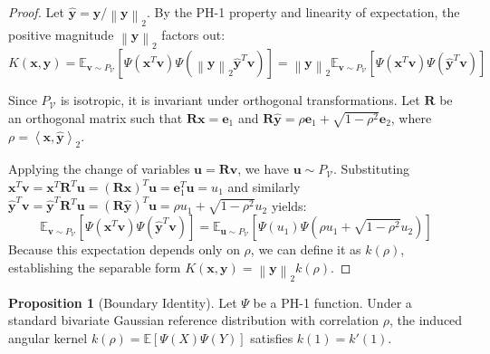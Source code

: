 \documentclass[11pt, a4paper, copyright, gdm]{google}
\newcommand{\norm}[1]{\left\lVert#1\right\rVert}
\newcommand{\inner}[2]{\left\langle#1, #2\right\rangle}
\newcommand{\eVect}{\boldsymbol{e}}
\newcommand{\uVect}{\boldsymbol{u}}
\newcommand{\vVect}{\boldsymbol{v}}
\newcommand{\xVect}{\boldsymbol{x}}
\newcommand{\yVect}{\boldsymbol{y}}
\newcommand{\calV}{\mathcal{V}}
\newcommand{\E}{\mathbb{E}}
\newcommand{\Rmat}{\boldsymbol{R}}
\theoremstyle{definition}
\newtheorem{proposition}[theorem]{Proposition}
\begin{document}
\begin{proof}
Let $\hat{\yVect} = \yVect / \norm{\yVect}_2$. By the PH-1 property and linearity of expectation, the positive magnitude $\norm{\yVect}_2$ factors out:
\begin{equation*}
    K(\xVect, \yVect) = \E_{\vVect \sim P_{\calV}} [\Psi(\xVect^T \vVect) \Psi(\norm{\yVect}_2 \hat{\yVect}^T \vVect)] = \norm{\yVect}_2 \E_{\vVect \sim P_{\calV}} [\Psi(\xVect^T \vVect) \Psi(\hat{\yVect}^T \vVect)]
\end{equation*}

Since $P_{\calV}$ is isotropic, it is invariant under orthogonal transformations. Let $\Rmat$ be an orthogonal matrix such that $\Rmat \xVect = \eVect_1$ and $\Rmat \hat{\yVect} = \rho \eVect_1 + \sqrt{1-\rho^2} \eVect_2$, where $\rho = \inner{\xVect}{\hat{\yVect}}_2$. 

Applying the change of variables $\uVect = \Rmat\vVect$, we have $\uVect \sim P_{\calV}$. Substituting $\xVect^T \vVect = \xVect^T \Rmat^T \uVect = (\Rmat\xVect)^T \uVect = \eVect_1^T \uVect = u_1$ and similarly $\hat{\yVect}^T \vVect = \hat{\yVect}^T \Rmat^T \uVect = (\Rmat\hat{\yVect})^T \uVect = \rho u_1 + \sqrt{1-\rho^2} u_2$ yields:
\begin{equation*}
    \E_{\vVect \sim P_{\calV}} [\Psi(\xVect^T \vVect) \Psi(\hat{\yVect}^T \vVect)] = \E_{\uVect \sim P_{\calV}} [\Psi(u_1) \Psi(\rho u_1 + \sqrt{1-\rho^2} u_2)] 
\end{equation*}
Because this expectation depends only on $\rho$, we can define it as $k(\rho)$, establishing the separable form $K(\xVect, \yVect) = \norm{\yVect}_2 k(\rho)$.
\end{proof}

\begin{proposition}[Boundary Identity]
\label{prop:boundary_identity}
Let $\Psi$ be a PH-1 function. Under a standard bivariate Gaussian reference distribution with correlation $\rho$, the induced angular kernel $k(\rho) = \E[\Psi(X)\Psi(Y)]$ satisfies $k(1) = k'(1)$.
\end{proposition}
\end{document}
